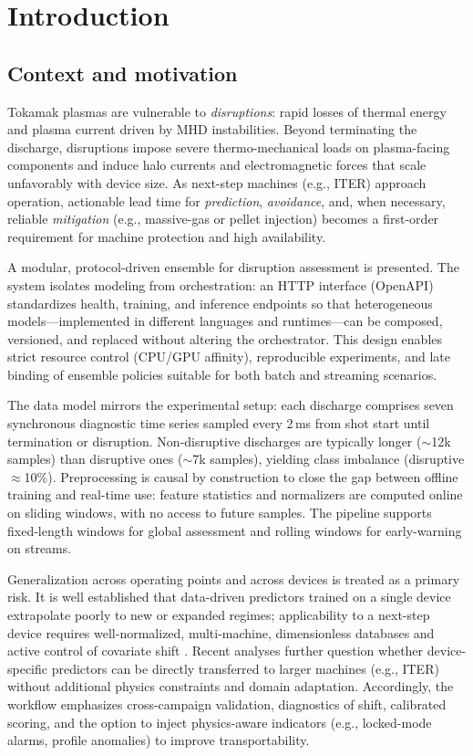\chapter{Introduction} \label{sec:cap1}

\section{Context and motivation}

Tokamak plasmas are vulnerable to \emph{disruptions}: rapid losses of thermal energy and plasma current driven by \ac{MHD} instabilities. Beyond terminating the discharge, disruptions impose severe thermo-mechanical loads on plasma-facing components and induce halo currents and electromagnetic forces that scale unfavorably with device size. As next-step machines (e.g., \ac{ITER}) approach operation, actionable lead time for \emph{prediction}, \emph{avoidance}, and, when necessary, reliable \emph{mitigation} (e.g., massive-gas or pellet injection) becomes a first-order requirement for machine protection and high availability.

A modular, protocol-driven ensemble for disruption assessment is presented. The system isolates modeling from orchestration: an \ac{HTTP} interface (OpenAPI) standardizes health, training, and inference endpoints so that heterogeneous models---implemented in different languages and runtimes---can be composed, versioned, and replaced without altering the orchestrator. This design enables strict resource control (CPU/GPU affinity), reproducible experiments, and late binding of ensemble policies suitable for both batch and streaming scenarios.

The data model mirrors the experimental setup: each discharge comprises seven synchronous diagnostic time series sampled every 2\,ms from shot start until termination or disruption. Non-disruptive discharges are typically longer ($\sim$12k samples) than disruptive ones ($\sim$7k samples), yielding class imbalance (disruptive $\approx$10\%). Preprocessing is causal by construction to close the gap between offline training and real-time use: feature statistics and normalizers are computed online on sliding windows, with no access to future samples. The pipeline supports fixed-length windows for global assessment and rolling windows for early-warning on streams.

Generalization across operating points and across devices is treated as a primary risk. It is well established that data-driven predictors trained on a single device extrapolate poorly to new or expanded regimes; applicability to a next-step device requires well-normalized, multi-machine, dimensionless databases and active control of covariate shift \parencite[p.~S188]{henderChapter3MHD2007}. Recent analyses further question whether device-specific predictors can be directly transferred to larger machines (e.g., \ac{ITER}) without additional physics constraints and domain adaptation. Accordingly, the workflow emphasizes cross-campaign validation, diagnostics of shift, calibrated scoring, and the option to inject physics-aware indicators (e.g., locked-mode alarms, profile anomalies) to improve transportability.



